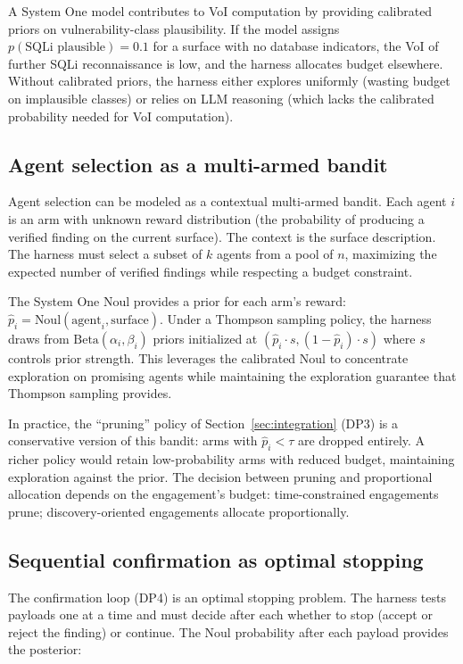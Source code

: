 \documentclass[conference]{IEEEtran}
\begin{document}
A System One model contributes to VoI computation by providing calibrated priors on vulnerability-class plausibility. If the model assigns $p(\text{SQLi plausible}) = 0.1$ for a surface with no database indicators, the VoI of further SQLi reconnaissance is low, and the harness allocates budget elsewhere. Without calibrated priors, the harness either explores uniformly (wasting budget on implausible classes) or relies on LLM reasoning (which lacks the calibrated probability needed for VoI computation).

\subsection{Agent selection as a multi-armed bandit}

Agent selection can be modeled as a contextual multi-armed bandit. Each agent $i$ is an arm with unknown reward distribution (the probability of producing a verified finding on the current surface). The context is the surface description. The harness must select a subset of $k$ agents from a pool of $n$, maximizing the expected number of verified findings while respecting a budget constraint.

The System One Noul provides a prior for each arm's reward: $\hat{p}_i = \text{Noul}(\text{agent}_i, \text{surface})$. Under a Thompson sampling policy, the harness draws from $\text{Beta}(\alpha_i, \beta_i)$ priors initialized at $(\hat{p}_i \cdot s, (1 - \hat{p}_i) \cdot s)$ where $s$ controls prior strength. This leverages the calibrated Noul to concentrate exploration on promising agents while maintaining the exploration guarantee that Thompson sampling provides.

In practice, the ``pruning'' policy of Section~\ref{sec:integration} (DP3) is a conservative version of this bandit: arms with $\hat{p}_i < \tau$ are dropped entirely. A richer policy would retain low-probability arms with reduced budget, maintaining exploration against the prior. The decision between pruning and proportional allocation depends on the engagement's budget: time-constrained engagements prune; discovery-oriented engagements allocate proportionally.

\subsection{Sequential confirmation as optimal stopping}

The confirmation loop (DP4) is an optimal stopping problem. The harness tests payloads one at a time and must decide after each whether to stop (accept or reject the finding) or continue. The Noul probability after each payload provides the posterior:
\end{document}
